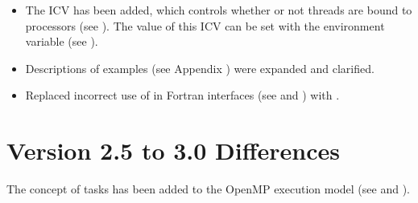 \begin{itemize}
\item The  ICV has been added, which controls whether or not threads are bound 
to processors (see 
). 
The value of this ICV can be set with 
the  environment variable (see 
).

\item Descriptions of examples (see 
Appendix ) 
were expanded and clarified.

\item Replaced incorrect use of  in Fortran interfaces (see 
and ) with 
. 
\end{itemize}







\section{Version 2.5 to 3.0 Differences}
\label{sec:Version 2.5 to 3.0 Differences}
The concept of tasks has been added to the OpenMP execution model (see 
 and 
). 

